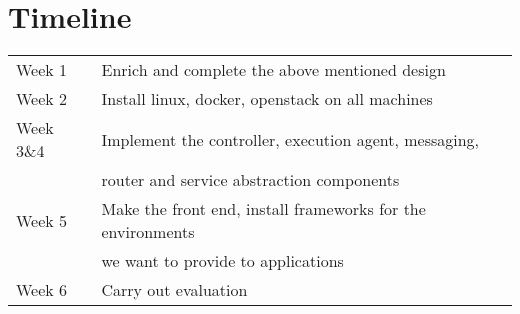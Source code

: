 \documentclass[a4paper]{article}
\begin{document}
  \setlength{\tabcolsep}{12pt}
  \section{Timeline}
  \begin{tabular}{ll}
  Week 1 & Enrich and complete the above mentioned design \\
  Week 2 & Install linux, docker, openstack on all machines \\
  Week 3\&4 & Implement the controller, execution agent, messaging,\\
  & router and service abstraction components \\
  Week 5 & Make the front end, install frameworks for the environments\\
  & we want to provide to applications \\
  Week 6 & Carry out evaluation \\
  \end{tabular} 
  
\iffalse
\begin{figure}[H]
\centering
\texttt{[image: registration.jpg]}
\caption{\label{fig:registration}Registration Page}
\end{figure}
\fi
\end{document}

